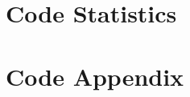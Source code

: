 \documentclass{article}
\begin{document}

\section{Code Statistics}

\section{Code Appendix}









\end{document}
